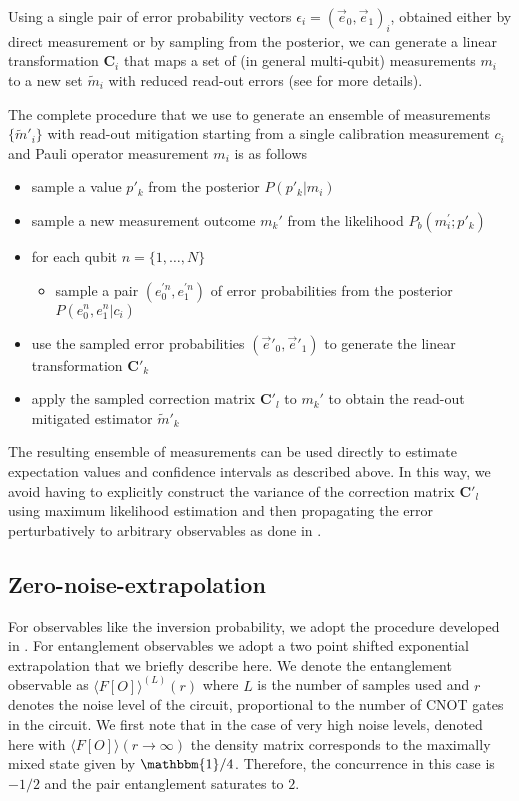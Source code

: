 \documentclass[10pt]{article}
\begin{document}
Using a single pair of error probability vectors $\epsilon_i=(\vec{e}_0,\vec{e}_1)_i$, obtained either by direct measurement or by sampling from the posterior, we can generate a linear transformation $\mathbf{C}_i$ that maps a set of (in general multi-qubit) measurements $m_i$ to a new set $\widetilde{m}_i$ with reduced read-out errors (see \cite{Roggero_nptodg} for more details).

The complete procedure that we use to generate an ensemble of measurements $\{\widetilde{m}'_i\}$ with read-out mitigation starting from a single calibration measurement $c_i$ and Pauli operator measurement $m_i$ is as follows
\begin{itemize}
    \item sample a value $p'_k$ from the posterior $P(p'_k\lvert m_i)$ 
	\item sample a new measurement outcome $m_k'$ from the likelihood $P_b(m_i^\prime;p'_k)$
	\item for each qubit $n=\{1,\dots,N\}$
	\begin{itemize}
	    \item sample a pair $(e^{\prime n}_0,e^{\prime n}_1)$ of error probabilities from the posterior $P(e^n_0,e^n_1|c_i)$ 
	\end{itemize}
	\item use the sampled error probabilities $(\vec{e}'_0,\vec{e}'_1)$ to generate the linear transformation $\mathbf{C}'_k$ 
	\item apply the sampled correction matrix $\mathbf{C}'_l$ to $m_k'$ to obtain the read-out mitigated estimator $\widetilde{m}'_k$
\end{itemize}

The resulting ensemble of measurements can be used directly to estimate expectation values and confidence intervals as described above. In this way, we avoid having to explicitly construct the variance of the correction matrix $\mathbf{C}'_l$ using maximum likelihood estimation and then propagating the error perturbatively to arbitrary observables as done in \cite{Roggero_nptodg}.

\subsection{Zero-noise-extrapolation}
For observables like the inversion probability, we adopt the procedure developed in \cite{Roggero_nptodg}. For entanglement observables we adopt a two point shifted exponential extrapolation that we briefly describe here. We denote the entanglement observable as $\langle F[O]\rangle^{(L)}(r)$ where $L$ is the number of samples used and $r$ denotes the noise level of the circuit, proportional to the number of CNOT gates in the circuit. We first note that in the case of very high noise levels, denoted here with $\langle F[O]\rangle(r\rightarrow\infty)$ the density matrix corresponds to the maximally mixed state given by $\mathbbm{1}/4$. Therefore, the concurrence in this case is $-1/2$ and the pair entanglement saturates to $2$.
\end{document}
